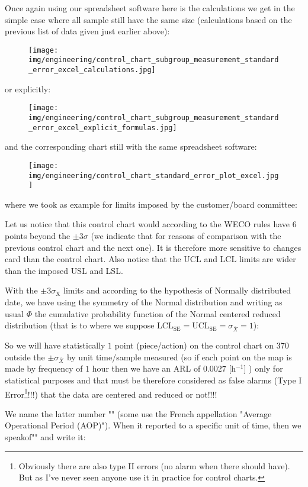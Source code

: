 	Once again using our spreadsheet software here is the calculations we get in the simple case where all sample still have the same size (calculations based on the previous list of data given just earlier above):
	\begin{figure}[H]
		\centering
		\texttt{[image: img/engineering/control\_chart\_subgroup\_measurement\_standard\_error\_excel\_calculations.jpg]}
	\end{figure}
	or explicitly:
	\begin{figure}[H]
		\centering
		\texttt{[image: img/engineering/control\_chart\_subgroup\_measurement\_standard\_error\_excel\_explicit\_formulas.jpg]}
	\end{figure}
	and the corresponding chart still with the same spreadsheet software:
	\begin{figure}[H]
		\centering
		\texttt{[image: img/engineering/control\_chart\_standard\_error\_plot\_excel.jpg]}
	\end{figure}
	where we took as example for limits imposed by the customer/board committee:
	
	Let us notice that this control chart would according to the WECO rules have $6$ points beyond the $\pm 3\sigma$ (we indicate that for reasons of comparison with the previous control chart and the next one). It is therefore more sensitive to changes card than the control chart. Also notice that the UCL and LCL limits are wider than the imposed USL and LSL.
	
	With the $\pm 3\sigma_{\text{X}}$ limits and according to the hypothesis of Normally distributed date, we have using the symmetry of the Normal distribution and writing as usual $\Phi$ the cumulative probability function of the Normal centered reduced distribution (that is to where we suppose $\text{LCL}_\text{SE}=\text{UCL}_\text{SE}=\sigma_{\overline{X}}=1$):
	
	So we will have statistically $1$ point (piece/action) on the control chart on $370$ outside the $\pm \sigma_{\overline{X}}$ by unit time/sample measured (so if each point on the map is made by frequency of $1$ hour then we have an ARL of $0.0027$ [h$^{-1}$] ) only for statistical purposes and that must be therefore considered as false alarms (Type I Error\footnote{Obviously there are also type II errors (no alarm when there should have). But as I've never seen anyone use it in practice for control charts.}!!!) that the data are centered and reduced or not!!!!
	
	We name the latter number "" (some use the French appellation "Average Operational Period (AOP)"). When it reported to a specific unit of time, then we speakof"" and write it:
	
